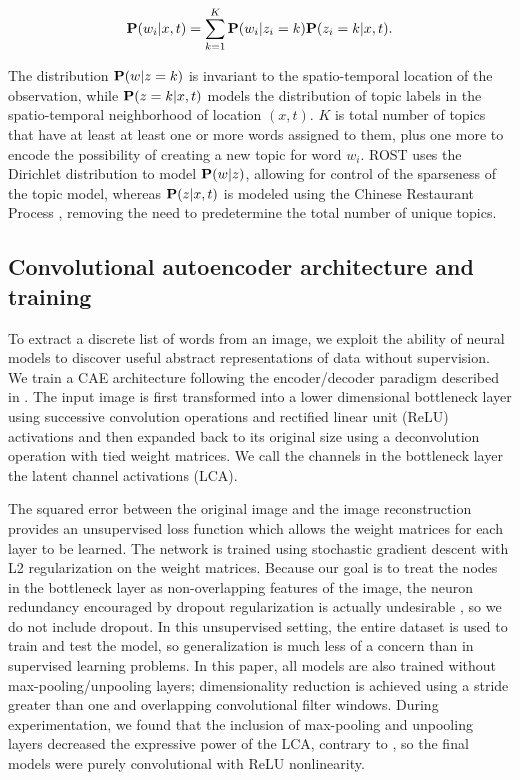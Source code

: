 \documentclass[letterpaper, 10 pt, conference]{ieeeconf}
\newcommand{\Prob} {\ensuremath \mathbf{P}  }
\begin{document}
\begin{eqnarray}
\Prob(w_i| x,t ) = \sum_{k=1}^K \Prob(w_i | z_i = k) \Prob(z_i = k | x,t).
\end{eqnarray}
    
The distribution $\Prob(w | z=k)$ is invariant to the spatio-temporal location of the observation, while $\Prob(z=k | x,t)$ models the distribution of topic labels in the spatio-temporal neighborhood of location $(x,t)$. $K$ is total number of topics that have at least at least one or more words assigned to them, plus one more to encode the possibility of creating a new topic for word $w_i$. ROST uses the Dirichlet distribution to model $\Prob(w|z)$, allowing for control of the sparseness of the topic model, whereas $\Prob(z|x,t)$ is modeled using the Chinese Restaurant Process \cite{Teh:2006:HDP}, removing the need to predetermine the total number of unique topics.  
\subsection{Convolutional autoencoder architecture and training} 
\label{sec:cae}
To extract a discrete list of words from an image, we exploit the ability of neural models to discover useful abstract representations of data without supervision. We train a CAE architecture following the encoder/decoder paradigm described in \cite{Masci}. The input image is first transformed into a lower dimensional bottleneck layer using successive convolution operations and rectified linear unit (ReLU) activations and then expanded back to its original size using a deconvolution operation with tied weight matrices. We call the channels in the bottleneck layer the latent channel activations (LCA). 

The squared error between the original image and the image reconstruction provides an unsupervised loss function which allows the weight matrices for each layer to be learned. The network is trained using stochastic gradient descent with L2 regularization on the weight matrices. Because our goal is to treat the nodes in the bottleneck layer as non-overlapping features of the image, the neuron redundancy encouraged by dropout regularization is actually undesirable \cite{Srivastava2014}, so we do not include dropout. In this unsupervised setting, the entire dataset is used to train and test the model, so generalization is much less of a concern than in supervised learning problems. In this paper, all models are also trained without max-pooling/unpooling layers; dimensionality reduction is achieved using a stride greater than one and overlapping convolutional filter windows. During experimentation, we found that the inclusion of max-pooling and unpooling layers decreased the expressive power of the LCA, contrary to \cite{Masci}, so the final models were purely convolutional with ReLU nonlinearity. 
    
\end{document}

